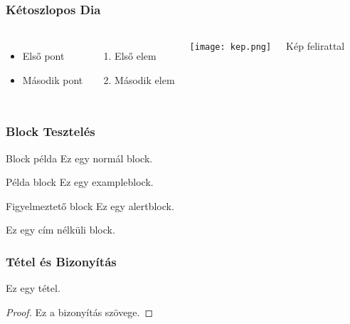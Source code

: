 \documentclass[12pt, aspectratio=169]{beamer}
\begin{document}
\begin{frame}
    \frametitle{Kétoszlopos Dia}
    \begin{columns}
        \begin{itemize}
            \item Első pont
            \item Második pont
        \end{itemize}
        \begin{enumerate}
            \item Első elem
            \item Második elem
        \end{enumerate}
        
        \texttt{[image: kep.png]}
        \caption{Kép felirattal}
    \end{columns}
\end{frame}

\begin{frame}
    \frametitle{Block Tesztelés}
    
    \begin{block}{Block példa}
        Ez egy normál block.
    \end{block}
    
    \begin{exampleblock}{Példa block}
        Ez egy exampleblock.
    \end{exampleblock}
    
    \begin{alertblock}{Figyelmeztető block}
        Ez egy alertblock.
    \end{alertblock}
    
    \begin{block}{}
        Ez egy cím nélküli block.
    \end{block}
\end{frame}

\begin{frame}
    \frametitle{Tétel és Bizonyítás}
    \begin{theorem}
        Ez egy tétel.
    \end{theorem}
    
    \begin{proof}
        Ez a bizonyítás szövege.
    \end{proof}
\end{frame}
\end{document}
